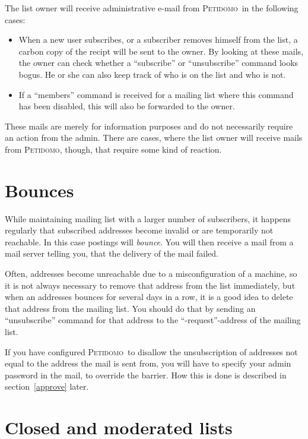 \documentclass[a4paper,10pt]{scrreprt}
\newcommand{\Petidomo}{{\scshape Peti\-domo}}
\newcommand{\Def}[1]{{\sl #1}}
\begin{document}
The list owner will receive administrative e-mail from \Petidomo\ in
the following cases:

\begin{itemize}

\item When a new user subscribes, or a subscriber removes himself from
the list, a carbon copy of the recipt will be sent to the owner. By
looking at these mails, the owner can check whether a ``subscribe'' or
``unsubscribe'' command looks bogus. He or she can also keep track of
who is on the list and who is not.

\item If a ``members'' command is received for a mailing list where
this command has been disabled, this will also be forwarded to the
owner.

\end{itemize}

These mails are merely for information purposes and do not necessarily
require an action from the admin. There are cases, where the list
owner will receive mails from \Petidomo, though, that require some
kind of reaction.

\section{Bounces}

While maintaining mailing list with a larger number of subscribers, it
happens regularly that subscribed addresses become invalid or are
temporarily not reachable. In this case postings will \Def{bounce}.
You will then receive a mail from a mail server telling you, that the
delivery of the mail failed.

Often, addresses become unreachable due to a misconfiguration of a
machine, so it is not always necessary to remove that address from the
list immediately, but when an addresses bounces for several days in a
row, it is a good idea to delete that address from the mailing list.
You should do that by sending an ``unsubscribe'' command for that
address to the ``-request''-address of the mailing list.

If you have configured \Petidomo\ to disallow the unsubscription of
addresses not equal to the address the mail is sent from, you will
have to specify your admin password in the mail, to override the
barrier. How this is done is described in section~\ref{approve} later.

\section{Closed and moderated lists}
\end{document}
